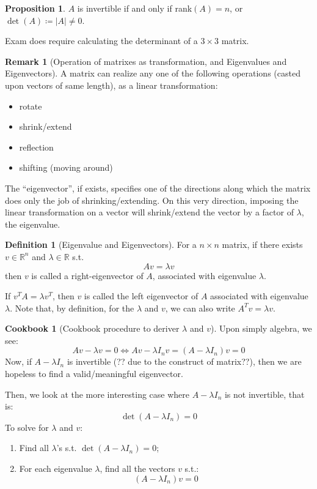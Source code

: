 \documentclass[12pt]{article}
\newcommand{\R}{{\mathbb R}}
\theoremstyle{definition}
\newtheorem{cookbook}[theorem]{Cookbook}
\newtheorem{definition}[theorem]{Definition}
\newtheorem{proposition}[theorem]{Proposition}
\newtheorem{remark}[theorem]{Remark}
\theoremstyle{plain}
\begin{document}
\begin{proposition}
    $A$ is invertible if and only if rank$(A) = n$, or
    $\det(A)\coloneqq |A| \not = 0$.
\end{proposition}

{\Huge Exam does require calculating the determinant of a $3\times 3$ matrix.}

\begin{remark}
    [Operation of matrixes as transformation, and Eigenvalues and Eigenvectors]
    A matrix can realize any one of the following operations (casted upon
    vectors of same length), as a linear transformation:
    \begin{itemize}
        \item rotate
        \item shrink/extend
        \item reflection
        \item shifting (moving around)
    \end{itemize}
    The ``eigenvector'', if exists, specifies one of the directions along which
    the matrix does only the job of shrinking/extending. On this very direction,
    imposing the linear transformation on a  vector will shrink/extend the
    vector by a factor of $\lambda$, the eigenvalue.
\end{remark}

\begin{definition}
    [Eigenvalue and Eigenvectors]
    For a $n \times n$ matrix, if there exists $v \in \R^n$ and $\lambda \in
    \R$ s.t.
    \[
        A v = \lambda v
    \]
    then $v$ is called  a right-eigenvector of $A$, associated with eigenvalue
    $\lambda$.

    If $v^T A = \lambda v^T$, then $v$ is called the left eigenvector of $A$
    associated with eigenvalue $\lambda$. Note that, by definition, for the
    $\lambda$ and $v$, we can also write $A^T v = \lambda v$.
\end{definition}

\begin{cookbook}
    [Cookbook procedure to deriver $\lambda$ and $v$]
    Upon simply algebra, we see:
    \[
        A v - \lambda v = 0 \iff A v- \lambda I_n v = (A - \lambda I_n) v = 0
    \]
    Now, if $A - \lambda I_n$ is invertible (?? due to the construct of
    matrix??), then we are hopeless to find a valid/meaningful eigenvector.

    Then, we look at the more interesting case where $A - \lambda I_n$ is not
    invertible, that is:
    \[
        \det (A - \lambda I_n) = 0
    \]
    To solve for $\lambda$ and $v$:
    \begin{enumerate}[Step 1:]
        \item Find all $\lambda$'s s.t. $\det (A - \lambda I_n) = 0$;
        \item For each eigenvalue $\lambda$, find all the vectors $v$ s.t.:
            \[
                (A - \lambda I_n) v = 0
            \]
    \end{enumerate}
\end{cookbook}
\end{document}
